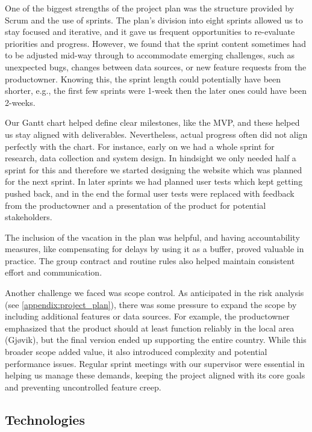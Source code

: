 One of the biggest strengths of the project plan was the structure provided by Scrum and the use of sprints. The plan's division into eight sprints allowed us to stay focused and iterative, and it gave us frequent opportunities to re-evaluate priorities and progress. However, we found that the sprint content sometimes had to be adjusted mid-way through to accommodate emerging challenges, such as unexpected bugs, changes between data sources, or new feature requests from the \gls{productowner}. Knowing this, the sprint length could potentially have been shorter, e.g., the first few sprints were 1-week then the later ones could have been 2-weeks. 

Our Gantt chart helped define clear milestones, like the MVP, and these helped us stay aligned with deliverables. Nevertheless, actual progress often did not align perfectly with the chart. For instance, early on we had a whole sprint for research, data collection and system design. In hindsight we only needed half a sprint for this and therefore we started designing the website which was planned for the next sprint. In later sprints we had planned user tests which kept getting pushed back, and in the end the formal user tests were replaced with feedback from the \gls{productowner} and a presentation of the product for potential stakeholders.

The inclusion of the vacation in the plan was helpful, and having accountability measures, like compensating for delays by using it as a buffer, proved valuable in practice. The group contract and routine rules also helped maintain consistent effort and communication.

Another challenge we faced was scope control. As anticipated in the risk analysis (see \autoref{appendix:project_plan}), there was some pressure to expand the scope by including additional features or data sources. For example, the \gls{productowner} emphasized that the product should at least function reliably in the local area (Gjøvik), but the final version ended up supporting the entire country. While this broader scope added value, it also introduced complexity and potential performance issues. Regular sprint meetings with our supervisor were essential in helping us manage these demands, keeping the project aligned with its core goals and preventing uncontrolled feature creep.

\subsection{Technologies}

